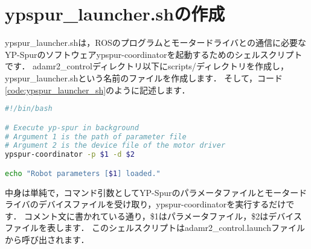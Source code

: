 \documentclass[{../../master}]{subfiles}
\begin{document}
\section{\textsf{ypspur\_launcher.sh}の作成}

\textsf{ypspur\_launcher.sh}は，ROSのプログラムとモータードライバとの通信に必要なYP-Spurのソフトウェア\textsf{ypspur-coordinator}を起動するためのシェルスクリプトです．
\textsf{adamr2\_control}ディレクトリ以下に\textsf{scripts/}ディレクトリを作成し，\textsf{ypspur\_launcher.sh}という名前のファイルを作成します．
そして，コード\ref{code:ypspur_launcher_sh}のように記述します．

\begin{lstlisting}[language=sh, label=code:ypspur_launcher_sh, caption=\textsf{ypspur\_launcher.sh}]
#!/bin/bash

# Execute yp-spur in background
# Argument 1 is the path of parameter file
# Argument 2 is the device file of the motor driver
ypspur-coordinator -p $1 -d $2

echo "Robot parameters [$1] loaded."
\end{lstlisting}

中身は単純で，コマンド引数としてYP-Spurのパラメータファイルとモータードライバのデバイスファイルを受け取り，\textsf{ypspur-coordinator}を実行するだけです．
コメント文に書かれている通り，\textsf{\$1}はパラメータファイル，\textsf{\$2}はデバイスファイルを表します．
このシェルスクリプトは\textsf{adamr2\_control.launch}ファイルから呼び出されます．
\end{document}
